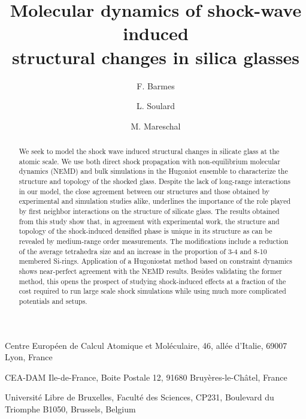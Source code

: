 \documentclass[aps,10pt,twocolumn]{revtex4}
\begin{document}
\graphicspath
{
{../imgs/}
}


\title{Molecular dynamics of shock-wave induced\\ structural changes in silica glasses}
\author{F. Barmes}

\affiliation
{
Centre Europ\'een de Calcul Atomique et Mol\'eculaire,
46, all\'ee d'Italie,
69007 Lyon, France
}


\author{L. Soulard}
\affiliation
{
CEA-DAM Ile-de-France,
Boite Postale 12,
91680 Bruy\`eres-le-Ch\^atel,
France
}



\author{M. Mareschal}
\affiliation
{
Universit\'e Libre de Bruxelles,
Facult\'e des Sciences, CP231,
Boulevard du Triomphe
B1050, Brussels, Belgium
}


\begin{abstract}
We seek to model the shock wave induced structural changes in silicate glass at the atomic
scale. We use both direct shock propagation with non-equilibrium molecular dynamics (NEMD) and
bulk  simulations in the Hugoniot ensemble to characterize the structure and topology of the
shocked glass. 
Despite the lack of long-range interactions in our model, the close agreement between our
structures and those obtained by experimental and simulation studies alike, underlines the
importance of the role played by first neighbor interactions on the structure of silicate glass.  
The results obtained from this study show that, in agreement with experimental work, the
structure and topology of the shock-induced densified phase is unique in its structure as can be
revealed by medium-range order measurements. The modifications include a reduction of the
average tetrahedra size and an increase in the proportion of 3-4 and 8-10 membered Si-rings. 
Application of a Hugoniostat method based on constraint dynamics shows near-perfect agreement
with the NEMD results. Besides validating the former method, this opens the prospect of studying
shock-induced effects at a fraction of the cost required to run large scale shock simulations
while using much more complicated potentials and setups.\\
\end{abstract}
\end{document}
